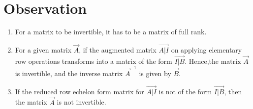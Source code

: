 \documentclass[journal,12pt,twocolumn]{IEEEtran}
\begin{document}
\section{Observation}
\begin{enumerate}
    \item For a matrix to be invertible, it has to be a matrix of full rank.
    \item For a given matrix $\vec{A}$, if the augmented matrix $\vec{A|I}$ on applying elementary row operations transforms into a matrix of the form $\vec{I|B}$. Hence,the matrix $\vec{A}$ is invertible, and the inverse matrix  $\vec{A}^{-1}$ is given by $\vec{B}$.
    \item If the reduced row echelon form matrix for $\vec{A|I}$ is not of the form $\vec{I|B}$, then the matrix $\vec{A}$ is not invertible.
\end{enumerate}
 
\end{document}
